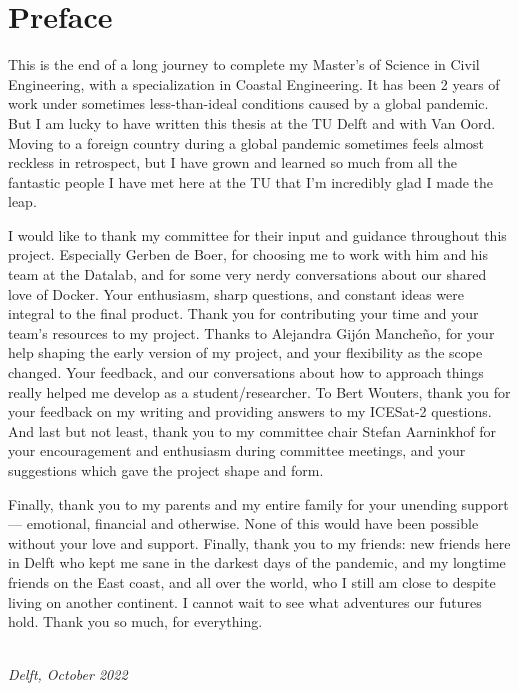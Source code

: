 \chapter*{Preface}


This is the end of a long journey to complete my Master's of Science in Civil Engineering, with a specialization in Coastal Engineering. It has been 2 years of work under sometimes less-than-ideal conditions caused by a global pandemic. But I am lucky to have written this thesis at the TU Delft and with Van Oord. Moving to a foreign country during a global pandemic sometimes feels almost reckless in retrospect, but I have grown and learned so much from all the fantastic people I have met here at the TU that I'm incredibly glad I made the leap.



I would like to thank my committee for their input and guidance throughout this project. Especially Gerben de Boer, for choosing me to work with him and his team at the Datalab, and for some very nerdy conversations about our shared love of Docker. Your enthusiasm, sharp questions, and constant ideas were integral to the final product. Thank you for contributing your time and your team's resources to my project. Thanks to Alejandra Gijón Mancheño, for your help shaping the early version of my project, and your flexibility as the scope changed. Your feedback, and our conversations about how to approach things really helped me develop as a student/researcher. To Bert Wouters, thank you for your feedback on my writing and providing answers to my ICESat-2 questions. And last but not least, thank you to my committee chair Stefan Aarninkhof for your encouragement and enthusiasm during committee meetings, and your suggestions which gave the project shape and form.



Finally, thank you to my parents and my entire family for your unending support --- emotional, financial and otherwise. None of this would have been possible without your love and support. Finally, thank you to my friends: new friends here in Delft who kept me sane in the darkest days of the pandemic, and my longtime friends on the East coast, and all over the world, who I still am close to despite living on another continent. I cannot wait to see what adventures our futures hold. Thank you so much, for everything.

\begin{flushright}
{\makeatletter\itshape
    \@author \\
    Delft, October 2022
\makeatother}
\end{flushright}

